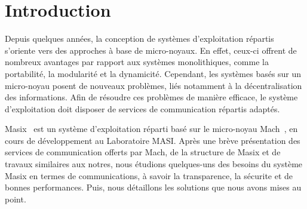 


\newcommand {\figps} [4]
{
    \begin{figure} [ht]
       \begin{center}
                \texttt{[image: \#1.ps]}
        	\caption {#4}
        	\label {fig:#1}
        \end{center}
    \end{figure}
}



\frenchspacing



\IEEEheader

\sloppy

\section{Introduction}

Depuis quelques ann\'ees, la conception de syst\`emes d'exploitation r\'epartis
s'oriente vers des approches \`a base de micro-noyaux. En effet, ceux-ci offrent de nombreux avantages par rapport aux syst\`emes monolithiques, comme
la portabilit\'e, la modularit\'e et la dynamicit\'e. 
Cependant, les syst\`emes bas\'es sur un micro-noyau posent de nouveaux 
probl\`emes, li\'es notamment \`a la d\'ecentralisation des informations. 
Afin de r\'esoudre ces probl\`emes de mani\`ere efficace, le syst\`eme 
d'exploitation doit disposer de services de communication r\'epartis adapt\'es.

Masix~\cite{masix:osf} est un syst\`eme d'exploitation r\'eparti bas\'e sur le 
micro-noyau Mach~\cite{mach:foundation}, en cours de d\'eveloppement au 
Laboratoire MASI. Apr\`es une br\`eve pr\'esentation des services de 
communication offerts par Mach, de la structure de Masix et de travaux 
similaires aux notres, nous \'etudions quelques-uns des besoins du syst\`eme 
Masix en termes de communications, \`a savoir la transparence, la s\'ecurite 
et de bonnes performances. Puis, nous d\'etaillons les solutions que nous
 avons mises au point.

